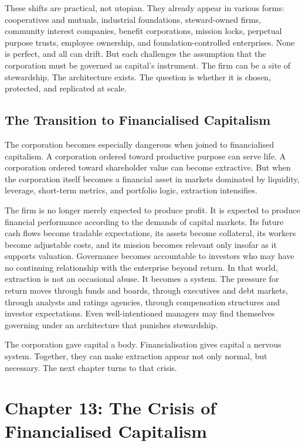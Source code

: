 \documentclass[11pt,a4paper,oneside]{book}
\begin{document}
These shifts are practical, not utopian. They already appear in various forms: cooperatives and mutuals, industrial foundations, steward-owned firms, community interest companies, benefit corporations, mission locks, perpetual purpose trusts, employee ownership, and foundation-controlled enterprises. None is perfect, and all can drift. But each challenges the assumption that the corporation must be governed as capital's instrument. The firm can be a site of stewardship. The architecture exists. The question is whether it is chosen, protected, and replicated at scale.

\section*{The Transition to Financialised Capitalism}

The corporation becomes especially dangerous when joined to financialised capitalism. A corporation ordered toward productive purpose can serve life. A corporation ordered toward shareholder value can become extractive. But when the corporation itself becomes a financial asset in markets dominated by liquidity, leverage, short-term metrics, and portfolio logic, extraction intensifies.

The firm is no longer merely expected to produce profit. It is expected to produce financial performance according to the demands of capital markets. Its future cash flows become tradable expectations, its assets become collateral, its workers become adjustable costs, and its mission becomes relevant only insofar as it supports valuation. Governance becomes accountable to investors who may have no continuing relationship with the enterprise beyond return. In that world, extraction is not an occasional abuse. It becomes a system. The pressure for return moves through funds and boards, through executives and debt markets, through analysts and ratings agencies, through compensation structures and investor expectations. Even well-intentioned managers may find themselves governing under an architecture that punishes stewardship.

The corporation gave capital a body. Financialisation gives capital a nervous system. Together, they can make extraction appear not only normal, but necessary. The next chapter turns to that crisis.

\chapter*{Chapter 13: The Crisis of Financialised Capitalism}
\end{document}
